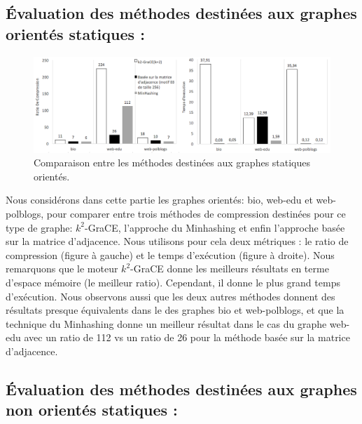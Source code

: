 	\subsection{Évaluation des méthodes destinées aux graphes orientés statiques :}
\begin{figure}[H]
		\begin{center}
		 \includegraphics[scale=0.4]{ressources/image/compNon.png}
			
			
			\caption{Comparaison entre les méthodes destinées aux graphes statiques orientés.}
			\label{fig:comp-dyn}
		\end{center}
	\end{figure}	
	
	Nous considérons dans cette partie les graphes orientés: bio, web-edu et web-polblogs, pour comparer entre trois méthodes de compression destinées pour ce type de graphe: $k^2$-GraCE, l'approche du Minhashing et enfin l'approche basée sur la matrice d'adjacence. Nous utilisons pour cela deux métriques : le ratio de compression (figure à gauche) et le temps d'exécution (figure à droite). Nous remarquons que le moteur $k^2$-GraCE donne les meilleurs résultats en terme d'espace mémoire (le meilleur ratio). Cependant, il donne le plus grand temps d'exécution. Nous observons aussi que les deux autres méthodes donnent des résultats presque équivalents dans le des graphes bio et web-polblogs, et que la technique du Minhashing donne un meilleur résultat dans le cas du graphe web-edu avec un ratio de 112 vs un ratio de 26 pour la méthode basée sur la matrice d'adjacence. 
	
	\subsection{Évaluation des méthodes destinées aux graphes non orientés statiques :}
	
